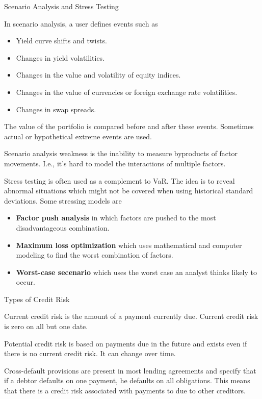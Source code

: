 \documentclass[../custom]{flashcards}
\newcommand{\studyArea}{Risk Management}
\begin{document}
\begin{flashcard}[\studyArea]{Scenario Analysis and Stress Testing}
    \begin{flushleft}
        In scenario analysis, a user defines events such as
        \begin{itemize}[parsep=1pt,itemsep=1pt]
            \item Yield curve shifts and twists.
            \item Changes in yield volatilities.
            \item Changes in the value and volatility of equity indices.
            \item Changes in the value of currencies or foreign exchange rate volatilities.
            \item Changes in swap spreads.
        \end{itemize}
        The value of the portfolio is compared before and after these events. Sometimes actual or hypothetical extreme events are used.\newline

        Scenario analysis weakness is the inability to measure byproducts of factor movements. I.e., it's hard to model the interactions of multiple factors.\newline

        Stress testing is often used as a complement to VaR. The idea is to reveal abnormal situations which might not be covered when using historical standard deviations. Some stressing models are
        \begin{itemize}[parsep=1pt,itemsep=1pt]
            \item \textbf{Factor push analysis} in which factors are pushed to the most disadvantageous combination.
            \item \textbf{Maximum loss optimization} which uses mathematical and computer modeling to find the worst combination of factors.
            \item \textbf{Worst-case secenario} which uses the worst case an analyst thinks likely to occur.
        \end{itemize}
    \end{flushleft}
\end{flashcard}

\begin{flashcard}[\studyArea]{Types of Credit Risk}
    \begin{flushleft}
        Current credit risk is the amount of a payment currently due. Current credit risk is zero on all but one date.\newline

        Potential credit risk is based on payments due in the future and exists even if there is no current credit risk. It can change over time.\newline

        Cross-default provisions are present in most lending agreements and specify that if a debtor defaults on one payment, he defaults on all obligations. This means that there is a credit risk associated with payments to due to other creditors.
    \end{flushleft}
\end{flashcard}
\end{document}

